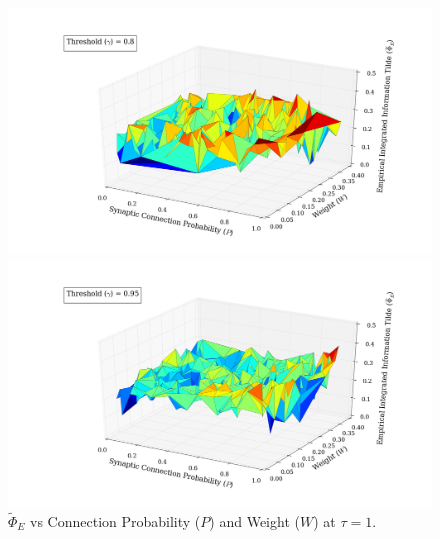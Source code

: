 \documentclass[a4paper,11pt]{article}
\begin{document}
\begin{figure}[H] 
	\begin{minipage}[b]{0.5\linewidth}
		\begin{center}
		\includegraphics[scale = 0.2]{figures/snn/p_w_phi_tilde_8_1}
		\end{center}
		\vspace{4ex}
	\end{minipage}
	\begin{minipage}[b]{0.5\linewidth}
		\begin{center}
		\includegraphics[scale = 0.2]{figures/snn/p_w_phi_tilde_95_1}
		\end{center}
		\vspace{4ex}
	\end{minipage}
	\caption{
		$\widetilde{\Phi}_E$ vs Connection Probability ($P$) and Weight ($W$) at $\tau = 1.$
		\label{fig:p_w_phi_tilde_1}
	}
\end{figure}
\end{document}
